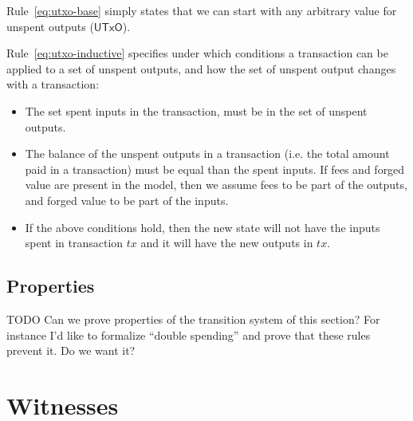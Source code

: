 \documentclass[11pt,a4paper]{article}
\newenvironment{todo}
  {\begin{bclogo}[logo=\bcoutil, couleur=red!5, couleurBarre=red, arrondi=0.2]{ TODO}}
  {\end{bclogo}}
\newcommand{\var}[1]{\mathit{#1}}
\newcommand{\type}[1]{\mathsf{#1}}
\newcommand{\UTxO}{\type{UTxO}}
\begin{document}
Rule~\ref{eq:utxo-base} simply states that we can start with any arbitrary
value for unspent outputs ($\UTxO$).

Rule~\ref{eq:utxo-inductive} specifies under which conditions a transaction can
be applied to a set of unspent outputs, and how the set of unspent output changes
with a transaction:
\begin{itemize}
\item The set spent inputs in the transaction, must be in the set of unspent
  outputs.
\item The balance of the unspent outputs in a transaction (i.e. the total
  amount paid in a transaction) must be equal than the spent inputs. If fees
  and forged value are present in the model, then we assume fees to be part of
  the outputs, and forged value to be part of the inputs.
\item If the above conditions hold, then the new state will not have the inputs
  spent in transaction $\var{tx}$ and it will have the new outputs in
  $\var{tx}$.
\end{itemize}

\subsection{Properties}
\label{sec:utxo-properties}


\begin{todo}
  Can we prove properties of the transition system of this section? For
  instance I'd like to formalize ``double spending'' and prove that these rules
  prevent it. Do we want it?
\end{todo}

\section{Witnesses}
\label{sec:witnesses}
\end{document}
